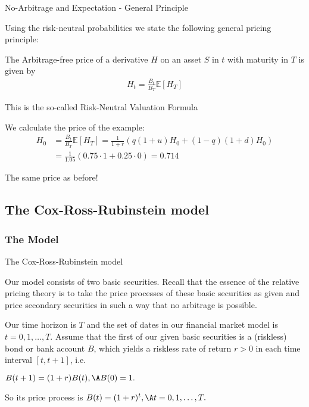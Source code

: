 {No-Arbitrage and Expectation - General Principle}
  \item Using the risk-neutral probabilities we state the following general pricing principle:
  \item The Arbitrage-free price of a derivative $H$ on an asset $S$ in $t$ with maturity in $T$ is given by
  \begin{align*}
    H_t = \frac{B_t}{B_T} \mathbb{E}[H_T]
  \end{align*}
  \item This is the so-called Risk-Neutral Valuation Formula
  \vspace{0.3cm}
  \item We calculate the price of the example:
  \begin{align*}
    H_0 & = \frac{B_t}{B_T} \mathbb{E}[H_T] = \frac{1}{1+r} (q (1+u) H_0 + (1-q) (1+d) H_0) \\
    & = \frac{1}{1.05} (0.75 \cdot 1 + 0.25 \cdot 0) = 0.714
  \end{align*}
  \item The same price as before!

\subsection{The Cox-Ross-Rubinstein model}
\subsubsection{The Model}

{ The Cox-Ross-Rubinstein model}

  \item Our model consists of two basic securities. Recall that the essence of the relative pricing theory
is to take the price processes of these basic securities as given
and price secondary securities in such a way that no arbitrage is
possible.
  \item Our time horizon is $T$ and the set of dates in our financial
market model is $t = 0,1, \ldots, T$. Assume that the first of our
given basic securities is a (riskless) bond or bank account $B$,
which yields a riskless rate of return $r >0$ in each time
interval $[t,t+1]$, i.e.
  \item $B(t+1)=(1+r)B(t),\A B(0)=1.$
\item So its price process is $ B(t) = (1+r)^t, \A t = 0,1, \ldots, T. $


